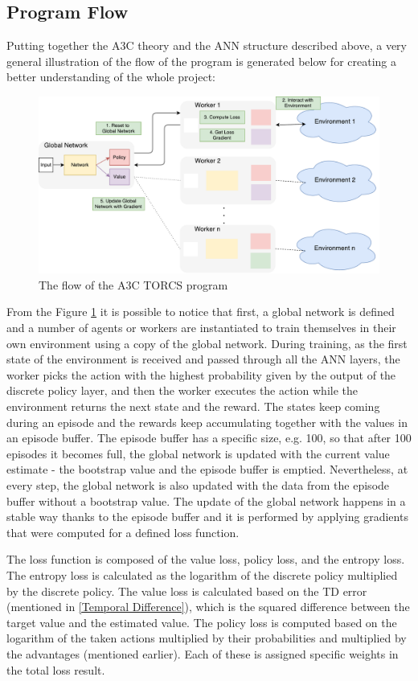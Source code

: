 \subsection{Program Flow}
Putting together the A3C theory and the ANN structure described above, a very general illustration of the flow of the program is generated below for creating a better understanding of the whole project:
\begin{figure}[H]
	\centering
	\includegraphics[width=1.25\textwidth]{Figures/Flow}
	\caption{The flow of the A3C TORCS program}
	\label{Flow}
\end{figure}
From the Figure \ref{Flow} it is possible to notice that first, a global network is defined and a number of agents or workers are instantiated to train themselves in their own environment using a copy of the global network. During training, as the first state of the environment is received and passed through all the ANN layers, the worker picks the action with the highest probability given by the output of the discrete policy layer, and then the worker executes the action while the environment returns the next state and the reward. The states keep coming during an episode and the rewards keep accumulating together with the values in an episode buffer. The episode buffer has a specific size, e.g. 100, so that after 100 episodes it becomes full, the global network is updated with the current value estimate - the bootstrap value and the episode buffer is emptied. Nevertheless, at every step, the global network is also updated with the data from the episode buffer without a bootstrap value. The update of the global network happens in a stable way thanks to the episode buffer and it is performed by applying gradients that were computed for a defined loss function.

The loss function is composed of the value loss, policy loss, and the entropy loss. The entropy loss is calculated as the logarithm of the discrete policy multiplied by the discrete policy. The value loss is calculated based on the TD error (mentioned in \ref{Temporal Difference}), which is the squared difference between the target value and the estimated value. The policy loss is computed based on the logarithm of the taken actions multiplied by their probabilities and multiplied by the advantages (mentioned earlier). Each of these is assigned specific weights in the total loss result. 

